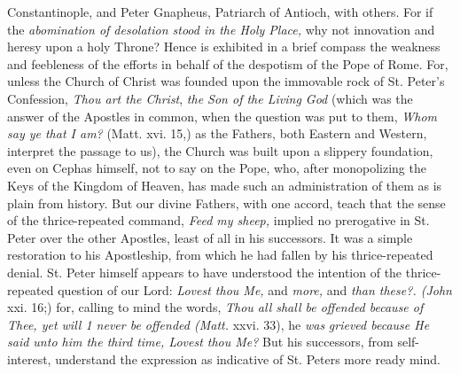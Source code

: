 Constantinople, and Peter Gnapheus, Patriarch of Antioch, with others.
For if the \emph{abomination of desolation stood in the Holy Place,} why
not innovation and heresy upon a holy Throne? Hence is exhibited in a
brief compass the weakness and feebleness of the efforts in behalf of
the despotism of the Pope of Rome. For, unless the Church of Christ was
founded upon the immovable rock of St. Peter's Confession, \emph{Thou
art the Christ}, \emph{the Son of the Living God} (which was the answer
of the Apostles in common, when the question was put to them, \emph{Whom
say ye that I am?} (Matt. xvi. 15,) as the Fathers, both Eastern and
Western, interpret the passage to us), the Church was built upon a
slippery foundation, even on Cephas himself, not to say on the Pope,
who, after monopolizing the Keys of the Kingdom of Heaven, has made such
an administration of them as is plain from history. But our divine
Fathers, with one accord, teach that the sense of the thrice-repeated
command, \emph{Feed my sheep,} implied no prerogative in St. Peter over
the other Apostles, least of all in his successors. It was a simple
restoration to his Apostleship, from which he had fallen by his
thrice-repeated denial. St. Peter himself appears to have understood the
intention of the thrice-repeated question of our Lord: \emph{Lovest thou
Me,} and \emph{more,} and \emph{than these?. (John} xxi. 16;) for,
calling to mind the words, \emph{Thou all shall be offended because of
Thee, yet will 1 never be offended (Matt.} xxvi. 33), he \emph{was}
\emph{grieved because He said unto him the third time, Lovest thou Me?}
But his successors, from self-interest, understand the expression as
indicative of St. Peter\textquotesingle s more ready mind.

